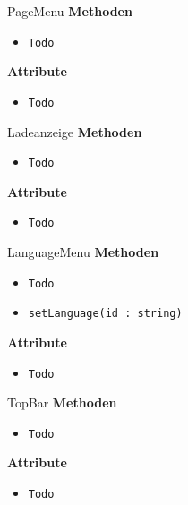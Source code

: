     \begin{Class}{PageMenu}
        \textbf{Methoden}
        \begin{itemize}
            \item \texttt{Todo}
        \end{itemize}
        
        \textbf{Attribute}
        \begin{itemize}
            \item \texttt{Todo}
        \end{itemize}
    \end{Class}

    \begin{Class}{Ladeanzeige}
        \textbf{Methoden}
        \begin{itemize}
            \item \texttt{Todo}
        \end{itemize}
        
        \textbf{Attribute}
        \begin{itemize}
            \item \texttt{Todo}
        \end{itemize}
    \end{Class}

    \begin{Class}{LanguageMenu}
        \textbf{Methoden}
        \begin{itemize}
            \item \texttt{Todo}
            \item \texttt{setLanguage(id : string)}
        \end{itemize}
        
        \textbf{Attribute}
        \begin{itemize}
            \item \texttt{Todo}
        \end{itemize}
    \end{Class}

    \begin{Class}{TopBar}
        \textbf{Methoden}
        \begin{itemize}
            \item \texttt{Todo}
        \end{itemize}
        
        \textbf{Attribute}
        \begin{itemize}
            \item \texttt{Todo}
        \end{itemize}
    \end{Class}

